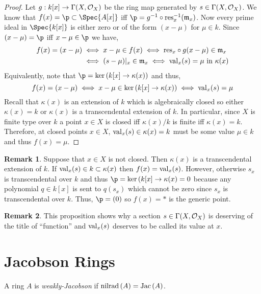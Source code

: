\documentclass[12pt]{extarticle}
\theoremstyle{definition}
\newtheorem{remark}{Remark}
\newenvironment{definition}[1][Definition:]{\begin{trivlist}
\item[\hskip \labelsep {\bfseries #1}]}{\end{trivlist}}
\newcommand{\res}{\mathrm{res}}
\newcommand{\m}{\mathfrak{m}}
\begin{document}
\begin{proof}
Let $g : k[x] \to \Gamma(X, \mathcal{O}_{X})$ be the ring map generated by $s \in \Gamma(X, \mathcal{O}_{X})$. We know that $f(x) = \p \subset \Spec{A[x]}$ iff $\p = g^{-1} \circ \res_x^{-1}(\m_x)$. Now every prime ideal in $\Spec{k[x]}$ is either zero or of the form $(x - \mu)$ for $\mu \in k$. Since $(x - \mu) = \p$ iff $x - \mu \in \p$ we have,
\begin{align*}
f(x) = (x - \mu) & \iff x - \mu \in f(x) \iff \res_x \circ g(x - \mu) \in \m_x
\\
&  \iff (s - \mu)|_x \in \m_x \iff \val_x(s) = \mu \text{ in } \kappa(x)
\end{align*}
Equivalently, note that $\p = \ker{(k[x] \to \kappa(x))}$ and thus,
\[ f(x) = (x - \mu) \iff x - \mu \in \ker{(k[x] \to \kappa(x))} \iff \mathrm{val}_x(s) = \mu \]
Recall that $\kappa(x)$ is an extension of $k$ which is algebraically closed so either $\kappa(x) = k$ or $\kappa(x)$ is a transcendental extension of $k$. In particular, since $X$ is finite type over $k$ a point $x \in X$ is closed iff $\kappa(x) / k$ is finite iff $\kappa(x) = k$. Therefore, at closed points $x \in X$, $\mathrm{val}_x(s) \in \kappa(x) = k$ must be some value $\mu \in k$ and thus $f(x) = \mu$.
\end{proof}

\begin{remark}
Suppose that $x \in X$ is not closed. Then $\kappa(x)$ is a transcendental extension of $k$. If $\mathrm{val}_x(s) \in k \subset \kappa(x)$ then $f(x) = \mathrm{val}_x(s)$. However, otherwise $s_x$ is transcendental over $k$ and thus $\p = \ker{(k[x] \to \kappa(x)} = 0$ because any polynomial $q \in k[x]$ is sent to $q(s_x)$ which cannot be zero since $s_x$ is transcendental over $k$. Thus, $\p = (0)$ so $f(x) = *$ is the generic point. 
\end{remark}

\begin{remark}
This proposition shows why a section $s \in \Gamma(X, \mathcal{O}_{X})$ is deserving of the title of ``function'' and $\mathrm{val}_x(s)$ deserves to be called its value at $x$. 
\end{remark}

\section{Jacobson Rings}

\newcommand{\nilrad}[1]{\mathrm{nilrad}\left(#1\right)}

\begin{definition}
A ring $A$ is \textit{weakly-Jacobson} if $\nilrad{A} = \Jac{A}$. 
\end{definition}
\end{document}
